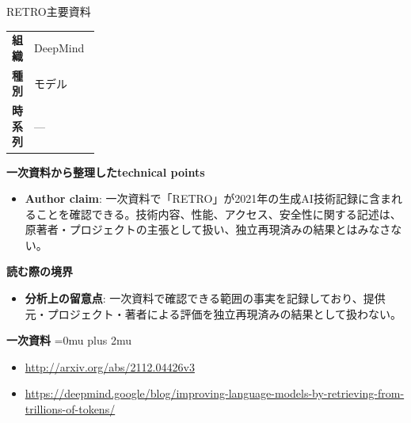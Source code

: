 \begin{technicalnote}{RETRO}{主要資料}
\begingroup
\begin{tabularx}{\linewidth}{@{}>{\bfseries}p{0.22\linewidth}X@{}}
組織 & DeepMind \\
種別 & モデル \\
時系列 & — \\
\end{tabularx}
\smallskip
{\bfseries 一次資料から整理したtechnical points}
\begin{itemize}[leftmargin=1.5em,itemsep=0.35em]
\item \textbf{Author claim}: 一次資料で「RETRO」が2021年の生成AI技術記録に含まれることを確認できる。技術内容、性能、アクセス、安全性に関する記述は、原著者・プロジェクトの主張として扱い、独立再現済みの結果とはみなさない。
\end{itemize}
\begin{minipage}{\linewidth}
{\bfseries 読む際の境界}
\begin{itemize}[leftmargin=1.5em,itemsep=0.35em]
\item \textbf{分析上の留意点}: 一次資料で確認できる範囲の事実を記録しており、提供元・プロジェクト・著者による評価を独立再現済みの結果として扱わない。
\end{itemize}
\begin{samepage}
{\bfseries 一次資料}
\begingroup\sloppy
\Urlmuskip=0mu plus 2mu\relax
\begin{itemize}[leftmargin=1.5em,itemsep=0.25em]
\item {\scriptsize\url{http://arxiv.org/abs/2112.04426v3}}
\item {\scriptsize\url{https://deepmind.google/blog/improving-language-models-by-retrieving-from-trillions-of-tokens/}}
\end{itemize}
\endgroup
\end{samepage}
\end{minipage}
\endgroup
\end{technicalnote}
\medskip

